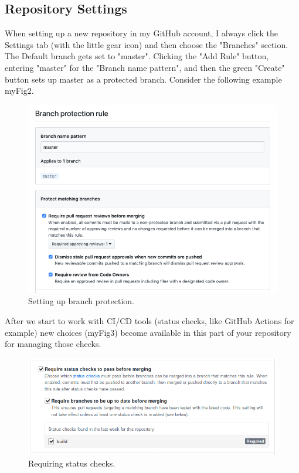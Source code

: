 \subsection{Repository Settings}

\justify
When setting up a new repository in my GitHub account, I always click
the Settings tab (with the little gear icon) and then choose the
"Branches" section. The Default branch gets set to "master". Clicking
the "Add Rule" button, entering "master" for the "Branch name pattern",
and then the green "Create" button sets up master as a protected branch.
Consider the following example {myFig2}.

\begin{figure}
      \includegraphics[scale=0.50]{../images/github-branch-protection.png}
      \caption{Setting up branch protection.}
\end{figure}

\justify
After we start to work with CI/CD tools (status checks, like GitHub
Actions for example) new choices ({myFig3}) become available in this
part of your repository for managing those checks.

\begin{figure}
      \includegraphics[scale=0.53]{../images/guthub-status-check.png}
      \caption{Requiring status checks.}
\end{figure}

